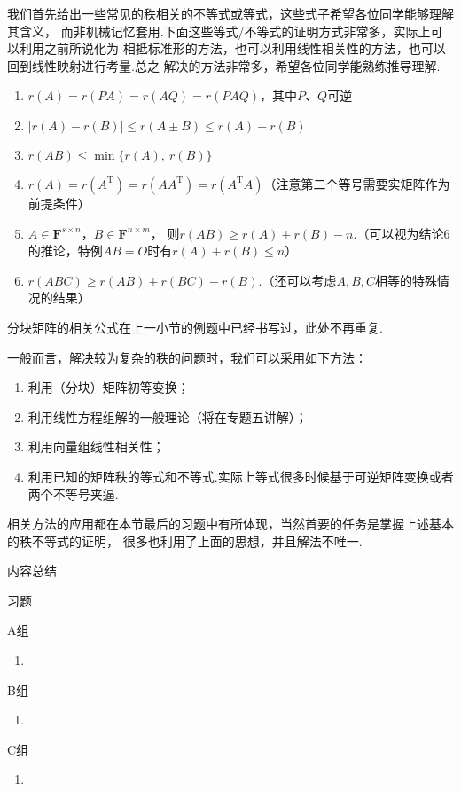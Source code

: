 我们首先给出一些常见的秩相关的不等式或等式，这些式子希望各位同学能够理解其含义，
而非机械记忆套用.下面这些等式/不等式的证明方式非常多，实际上可以利用之前所说化为
相抵标准形的方法，也可以利用线性相关性的方法，也可以回到线性映射进行考量.总之
解决的方法非常多，希望各位同学能熟练推导理解.
\begin{enumerate}
    \item $r(A)=r(PA)=r(AQ)=r(PAQ)$，其中$P$、$Q$可逆
    \item $|r(A)-r(B)|\leqslant r(A\pm B) \leqslant r(A)+r(B)$
    \item $r(AB) \leqslant \min\{r(A),\ r(B)\}$
    \item $r(A)=r(A^\mathrm{T})=r(AA^\mathrm{T})=r(A^\mathrm{T}A)$（注意第二个等号需要实矩阵作为前提条件）
    \item $A \in \mathbf{F}^{s \times n}$，$B \in \mathbf{F}^{n \times m}$，
    则$r(AB) \geqslant r(A)+r(B)-n$.（可以视为结论6的推论，特例$AB=O$时有$r(A)+r(B)\leqslant n$）
    \item $r(ABC) \geqslant r(AB)+r(BC)-r(B)$.（还可以考虑$A,B,C$相等的特殊情况的结果）
\end{enumerate}

分块矩阵的相关公式在上一小节的例题中已经书写过，此处不再重复.

一般而言，解决较为复杂的秩的问题时，我们可以采用如下方法：
\begin{enumerate}
    \item 利用（分块）矩阵初等变换；

    \item 利用线性方程组解的一般理论（将在专题五讲解）；

    \item 利用向量组线性相关性；

    \item 利用已知的矩阵秩的等式和不等式.实际上等式很多时候基于可逆矩阵变换或者两个不等号夹逼.
\end{enumerate}

相关方法的应用都在本节最后的习题中有所体现，当然首要的任务是掌握上述基本的秩不等式的证明，
很多也利用了上面的思想，并且解法不唯一.

\vspace{2ex}
\centerline{\heiti \Large 内容总结}

\vspace{2ex}

\centerline{\heiti \Large 习题}
\vspace{2ex}
{\kaishu }
\begin{flushright}
    \kaishu

\end{flushright}
\centerline{\heiti A组}
\begin{enumerate}
    \item
\end{enumerate}
\centerline{\heiti B组}
\begin{enumerate}
    \item
\end{enumerate}
\centerline{\heiti C组}
\begin{enumerate}
    \item
\end{enumerate}
